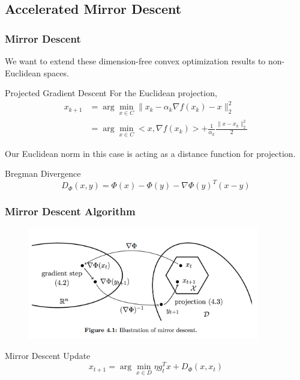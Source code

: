 \documentclass{beamer}
\begin{document}
\subsection{Accelerated Mirror Descent}

\begin{frame}
\frametitle{Mirror Descent}
We want to extend these dimension-free convex optimization results to non-Euclidean spaces.
\begin{block}{Projected Gradient Descent}
For the Euclidean projection,
\begin{align*}
x_{k+1} &= \arg\min_{x \in C}\|x_k -\alpha_k \nabla f(x_k) - x\|_2^2 \\
&= \arg\min_{x \in C} <x, \nabla f(x_k)> + \frac{1}{\alpha_k}\frac{\|x - x_k\|_2^2}{2}
\end{align*}
\end{block}
Our Euclidean norm in this case is acting as a distance function for projection.
\begin{block}{Bregman Divergence}
$$D_\Phi(x,y) = \Phi(x) - \Phi(y) - \nabla \Phi(y)^T(x-y)$$
\end{block}
\end{frame}

\begin{frame}
\frametitle{Mirror Descent Algorithm}
\begin{figure}
    \centering
    \includegraphics[width=0.9\textwidth]{Images/mda.png}
\end{figure}
\begin{block}{Mirror Descent Update}
$$x_{t+1} = \arg\min_{x \in D} \eta g_t^Tx + D_{\Phi}(x,x_t)$$
\end{block}
\end{frame}

\end{document}
